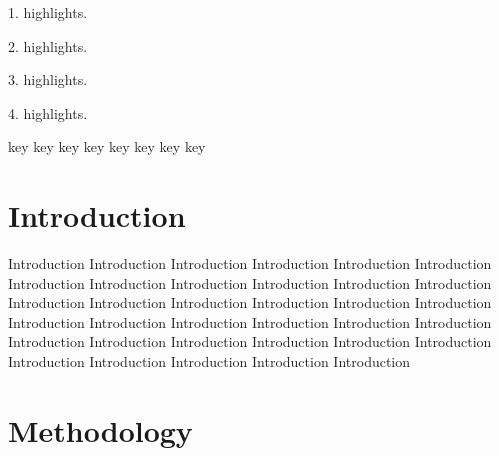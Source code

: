 \documentclass[a4paper,fleqn]{cas-sc}
\begin{document}
\begin{highlights}
\item 1. highlights.
\item 2. highlights.
\item 3. highlights.
\item 4. highlights.
\end{highlights}


\begin{keywords}
key key key key key key key key 
\end{keywords}

\maketitle

\section{Introduction}%
\par
Introduction Introduction Introduction Introduction Introduction Introduction Introduction Introduction Introduction Introduction Introduction Introduction Introduction Introduction Introduction Introduction Introduction Introduction Introduction Introduction Introduction Introduction Introduction Introduction Introduction Introduction Introduction Introduction Introduction Introduction Introduction Introduction Introduction Introduction Introduction 
\section{Methodology}
\par
\end{document}
